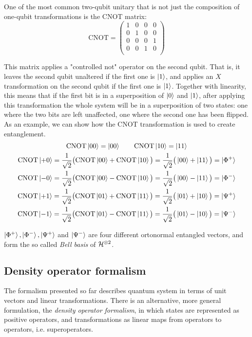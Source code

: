 One of the most common two-qubit unitary that is not just the composition of one-qubit transformations is the CNOT matrix:
\[\text{CNOT} = 
\begin{pmatrix}
1 & 0 & 0 & 0 \\
0 & 1 & 0 & 0 \\
0 & 0 & 0 & 1 \\
0 & 0 & 1 & 0 \\
\end{pmatrix}
\]

This matrix applies a "controlled not" operator on the second qubit. That is, it leaves the second qubit unaltered if the first one is $\ket{1}$, and applies an $X$ transformation on the second qubit if the first one is $\ket{1}$. Together with linearity, this means that if the first bit is in a superposition of $\ket{0}$ and $\ket{1}$, after applying this transformation the whole system will be in a superposition of two states: one where the two bits are left unaffected, one where the second one has been flipped. As an example, we can show how the CNOT transformation is used to create entanglement.
\begin{gather*}
\text{CNOT} \ket{00} = \ket{00} \qquad \text{CNOT} \ket{10} = \ket{11} 
\\
\text{CNOT} \ket{+0} = \frac{1}{\sqrt{2}}\big(\text{CNOT}\ket{00} + \text{CNOT}\ket{10}\big) = \frac{1}{\sqrt{2}}
\big(\ket{00} + \ket{11}\big) = \ket{\Phi^+}
\\
\text{CNOT} \ket{-0} = \frac{1}{\sqrt{2}}\big(\text{CNOT}\ket{00} - \text{CNOT}\ket{10}\big) = \frac{1}{\sqrt{2}}
\big(\ket{00} - \ket{11}\big) = \ket{\Phi^-}
\\
\text{CNOT} \ket{+1} = \frac{1}{\sqrt{2}}\big(\text{CNOT}\ket{01} + \text{CNOT}\ket{11}\big) = \frac{1}{\sqrt{2}}
\big(\ket{01} + \ket{10}\big) = \ket{\Psi^+}
\\
\text{CNOT} \ket{-1} = \frac{1}{\sqrt{2}}\big(\text{CNOT}\ket{01} - \text{CNOT}\ket{11}\big) = \frac{1}{\sqrt{2}}
\big(\ket{01} - \ket{10}\big) = \ket{\Psi^-}
\end{gather*}

$\ket{\Phi^+}, \ket{\Phi^-}, \ket{\Psi^+}$ and 
$\ket{\Psi^-}$ are four different ortonormal entangled vectors, and form the so called \textit{Bell basis} of $\mathcal{H}^{\otimes 2}$.

\subsection{Density operator formalism}

The formalism presented so far describes quantum system in terms of unit vectors and linear transformations. There is an alternative, more general formulation, the \textit{density operator formalism}, in which states are represented as positive operators, and transformations as linear maps from operators to operators, i.e. superoperators.

